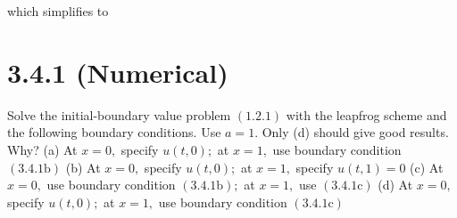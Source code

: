 \documentclass[12pt]{article}
\begin{document}
\noindent which simplifies to



\section*{3.4.1 (Numerical)}
Solve the initial-boundary value problem $(1.2 .1)$ with the leapfrog scheme and the following boundary conditions. Use $a=1 .$ Only (d) should give good results. Why?
(a) At $x=0,$ specify $u(t, 0) ;$ at $x=1,$ use boundary condition $(3.4 .1 \mathrm{b})$
(b) At $x=0,$ specify $u(t, 0) ;$ at $x=1,$ specify $u(t, 1)=0$
(c) At $x=0,$ use boundary condition $(3.4 .1 \mathrm{b}) ;$ at $x=1,$ use $(3.4 .1 \mathrm{c})$
(d) At $x=0,$ specify $u(t, 0) ;$ at $x=1,$ use boundary condition $(3.4 .1 \mathrm{c})$
\end{document}
